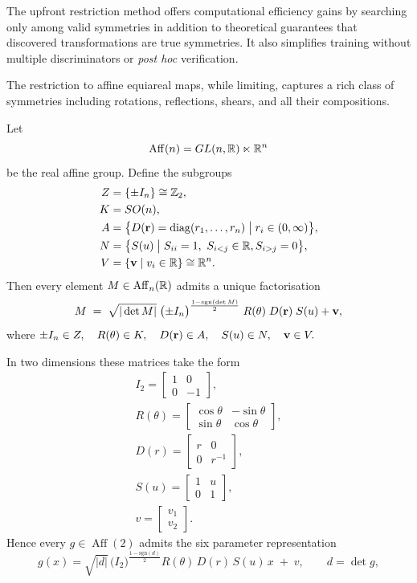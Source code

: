     The upfront restriction method offers computational efficiency gains by searching only among valid symmetries in addition to theoretical guarantees that discovered transformations are true symmetries.
    It also simplifies training without multiple discriminators or \textit{post hoc} verification.

    The restriction to affine equiareal maps, while limiting, captures a rich class of symmetries including rotations, reflections, shears, and all their compositions.
\begin{theorem}
\noproofref
\label{thm:iwasawa_affine}
Let 
\[
    \operatorname{Aff}(n)= GL(n, \mathbb{R})\ltimes\mathbb{R}^n
\]
be the real affine group.  Define the subgroups
\[
\begin{aligned}
Z &= \{\pm I_n\}\cong \mathbb{Z}_2,\\
K &= SO(n),\\
A &= \bigl\{D(\vb r)=\operatorname{diag}(r_1,\dots,r_n)\;\big|\;r_i\in(0,\infty)\bigr\},\\
N &= \bigl\{S(u) \;\big|\;S_{ii}=1,\ S_{i < j}\in\mathbb{R}, S_{i>j}=0\bigr\},\\
V &= \qty{\vb v \mid v_i\in\mathbb{R}}\cong\mathbb{R}^n.
\end{aligned}
\]
Then every element $M\in\operatorname{Aff}_n(\mathbb{R})$ admits a unique factorisation
\[
M \;=\;
\sqrt{|\det M|}\;\bigl(\pm I_n\bigr)^{\frac{1-\text{sgn}(\det M)}{2}}
\;R(\vb\theta)\;D(\vb r)\;S(u) + \vb v,
\]
where
\(
\pm I_n\in Z,\quad R(\vb\theta)\in K,\quad D(\vb r)\in A,\quad S(u)\in N,\quad \vb v\in V.
\)
\end{theorem}
In two dimensions these matrices take the form
\begin{gather}
I_2=\begin{bmatrix}1&0\\0&-1\end{bmatrix},\\
R(\theta)=\begin{bmatrix}\cos\theta & -\sin\theta\\
\sin\theta & \cos\theta\end{bmatrix},\\
D(r)=\begin{bmatrix}r & 0\\0 & r^{-1}\end{bmatrix},\\
S(u)=\begin{bmatrix}1 & u\\0 & 1\end{bmatrix},\\
v=\begin{bmatrix}v_1\\v_2\end{bmatrix}.
\end{gather}
Hence every $g\in\operatorname{Aff}(2)$ admits the six parameter representation
\[
g(x)=\sqrt{|d|}\,\bigl(I_2\bigr)^{\frac{1-\text{sgn}(d)}{2}}
R(\theta)\,D(r)\,S(u)\,x \;+\;v,
\qquad d=\det g,
\]

